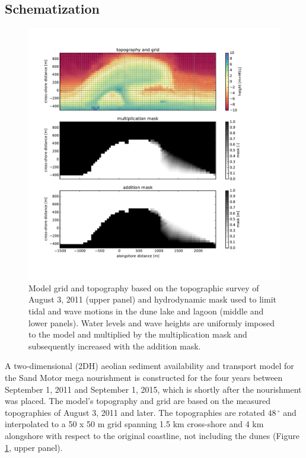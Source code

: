 \subsection{Schematization}

\begin{figure}
  \centering
  \includegraphics[width=\columnwidth]{../Figures/gridmask}
  \caption{Model grid and topography based on the topographic survey
    of August 3, 2011 (upper panel) and hydrodynamic mask used to
    limit tidal and wave motions in the dune lake and lagoon (middle
    and lower panels). Water levels and wave heights are uniformly
    imposed to the model and multiplied by the multiplication mask and
    subsequently increased with the addition mask.}
  \label{fig:gridmask}
\end{figure}

A two-dimensional (2DH) aeolian sediment availability and transport
model for the Sand Motor mega nourishment is constructed for the four
years between September 1, 2011 and September 1, 2015, which is
shortly after the nourishment was placed. The model's topography and
grid are based on the measured topographies of August 3, 2011 and
later. The topographies are rotated $48\,^{\circ}$ and interpolated to
a 50 x 50 m grid spanning 1.5 km cross-shore and 4 km alongshore with
respect to the original coastline, not including the dunes (Figure
\ref{fig:gridmask}, upper panel).

